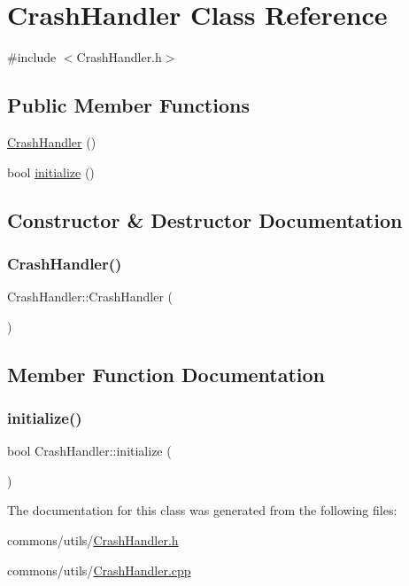 \hypertarget{class_crash_handler}{}\section{Crash\+Handler Class Reference}
\label{class_crash_handler}


{\ttfamily \#include $<$Crash\+Handler.\+h$>$}

\subsection*{Public Member Functions}
\begin{DoxyCompactItemize}
\item 
\mbox{\hyperlink{class_crash_handler_ac9b28f81520af7a91c88b63927dffb8a}{Crash\+Handler}} ()
\item 
bool \mbox{\hyperlink{class_crash_handler_a3d301cb39827af4fb1b17ed576c88132}{initialize}} ()
\end{DoxyCompactItemize}


\subsection{Constructor \& Destructor Documentation}
\mbox{\label{class_crash_handler_ac9b28f81520af7a91c88b63927dffb8a}} 
\subsubsection{\texorpdfstring{CrashHandler()}{CrashHandler()}}
{\footnotesize\ttfamily Crash\+Handler\+::\+Crash\+Handler (\begin{DoxyParamCaption}{ }\end{DoxyParamCaption})}



\subsection{Member Function Documentation}
\mbox{\label{class_crash_handler_a3d301cb39827af4fb1b17ed576c88132}} 
\subsubsection{\texorpdfstring{initialize()}{initialize()}}
{\footnotesize\ttfamily bool Crash\+Handler\+::initialize (\begin{DoxyParamCaption}{ }\end{DoxyParamCaption})}



The documentation for this class was generated from the following files\+:\begin{DoxyCompactItemize}
\item 
commons/utils/\mbox{\hyperlink{_crash_handler_8h}{Crash\+Handler.\+h}}\item 
commons/utils/\mbox{\hyperlink{_crash_handler_8cpp}{Crash\+Handler.\+cpp}}\end{DoxyCompactItemize}
